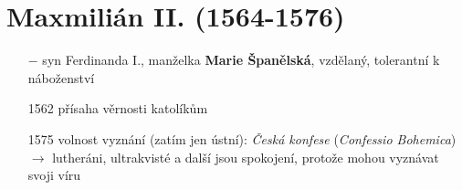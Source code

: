 \documentclass{article}
\begin{document}
\section*{Maxmilián II. (1564-1576)}
\begin{itemize}
    \vspace{-0.5em}
    \setlength\itemsep{0.15em}
    \item[$-$] syn Ferdinanda I., manželka \textbf{Marie Španělská}, vzdělaný, tolerantní k náboženství
    \item[1562] přísaha věrnosti katolíkům
    \item[1575] volnost vyznání (zatím jen ústní): \textit{Česká konfese} (\textit{Confessio Bohemica}) $\rightarrow$ lutheráni, ultrakvisté a další jsou spokojení, protože mohou vyznávat svoji víru
\end{itemize}
\end{document}
